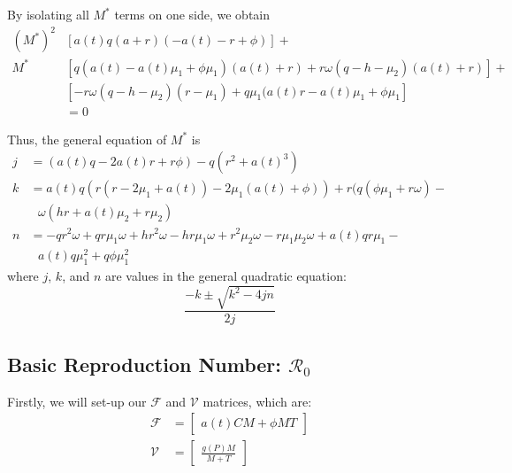 \documentclass[12pt]{article}
\begin{document}
    By isolating all $M^{*}$ terms on one side, we obtain
    \begin{align*}
        (M^{*})^{2}&[a(t)q(a+r)(-a(t)-r+\phi)] +  \\ 
        M^{*}&[q(a(t) - a(t) \mu_{1} + \phi \mu_{1})(a(t) + r) + r \omega (q-h-\mu_{2})(a(t) +r)] +  \\
        &[-r \omega(q - h - \mu_{2})(r - \mu_{1}) + q \mu_{1}(a(t)r - a(t) \mu_{1} + \phi \mu_{1}] \\
        &= 0
    \end{align*}
    
    
    Thus, the general equation of $M^{*}$ is
    \begin{align*}
        j &= (a(t)q-2a(t)r+r \phi ) - q(r^{2}+a(t)^{3})\\
        k &= a(t)q(r(r-2\mu_{1}+a(t))-2\mu_{1}(a(t)+\phi )) +  r(q(\phi \mu_{1} + r \omega ) - \\ & \ \ \  \omega(hr+a(t) \mu_{2} + r\mu_{2})\\
        n &= -qr^{2} \omega +qr\mu_{1} \omega + hr^{2} \omega - hr\mu_{1} \omega + r^2 \mu_{2} \omega - r \mu_{1} \mu_{2} \omega + a(t)qr \mu_{1} - \\ & \ \ \  a(t)q\mu_{1}^{2} +q\phi \mu_{1}^{2}
    \end{align*}
    where $j$, $k$, and $n$ are values in the general quadratic equation:
    \begin{equation*}
        \frac{-k \pm \sqrt{k^2 - 4jn}}{2j}
    \end{equation*}

    \subsection{Basic Reproduction Number: $\mathscr{R}_0$}
        \label{appendix:A3}
        Firstly, we will set-up our $\mathscr{F}$ and $\mathscr{V}$ matrices, which are:
        \begin{align*}
            \mathscr{F} &= \begin{bmatrix}
                            a(t)CM + \phi MT
                          \end{bmatrix}\\
            \mathscr{V} &= \begin{bmatrix}
                            \frac{g(P)M}{M+T}
                          \end{bmatrix}              
        \end{align*}
        
\end{document}
